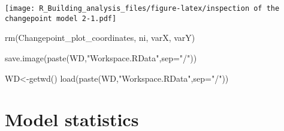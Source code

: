 \documentclass[
]{article}
\newenvironment{Shaded}{\begin{snugshade}}{\end{snugshade}}
\newcommand{\AttributeTok}[1]{\textcolor[rgb]{0.77,0.63,0.00}{#1}}
\newcommand{\ControlFlowTok}[1]{\textcolor[rgb]{0.13,0.29,0.53}{\textbf{#1}}}
\newcommand{\FunctionTok}[1]{\textcolor[rgb]{0.00,0.00,0.00}{#1}}
\newcommand{\NormalTok}[1]{#1}
\newcommand{\OtherTok}[1]{\textcolor[rgb]{0.56,0.35,0.01}{#1}}
\newcommand{\SpecialCharTok}[1]{\textcolor[rgb]{0.00,0.00,0.00}{#1}}
\newcommand{\StringTok}[1]{\textcolor[rgb]{0.31,0.60,0.02}{#1}}
\begin{document}
\begin{Shaded}
\end{Shaded}

\texttt{[image: R\_Building\_analysis\_files/figure-latex/inspection of the changepoint model 2-1.pdf]}

\begin{Shaded}
\begin{Highlighting}[]
\FunctionTok{rm}\NormalTok{(Changepoint\_plot\_coordinates, ni, varX, varY)}
\end{Highlighting}
\end{Shaded}

\begin{Shaded}
\begin{Highlighting}[]
\FunctionTok{save.image}\NormalTok{(}\FunctionTok{paste}\NormalTok{(WD,}\StringTok{"Workspace.RData"}\NormalTok{,}\AttributeTok{sep=}\StringTok{"/"}\NormalTok{))}

\NormalTok{WD}\OtherTok{\textless{}{-}}\FunctionTok{getwd}\NormalTok{()}
\FunctionTok{load}\NormalTok{(}\FunctionTok{paste}\NormalTok{(WD,}\StringTok{"Workspace.RData"}\NormalTok{,}\AttributeTok{sep=}\StringTok{"/"}\NormalTok{))}
\end{Highlighting}
\end{Shaded}

\hypertarget{model-statistics}{%
\section{Model statistics}\label{model-statistics}}
\end{document}
